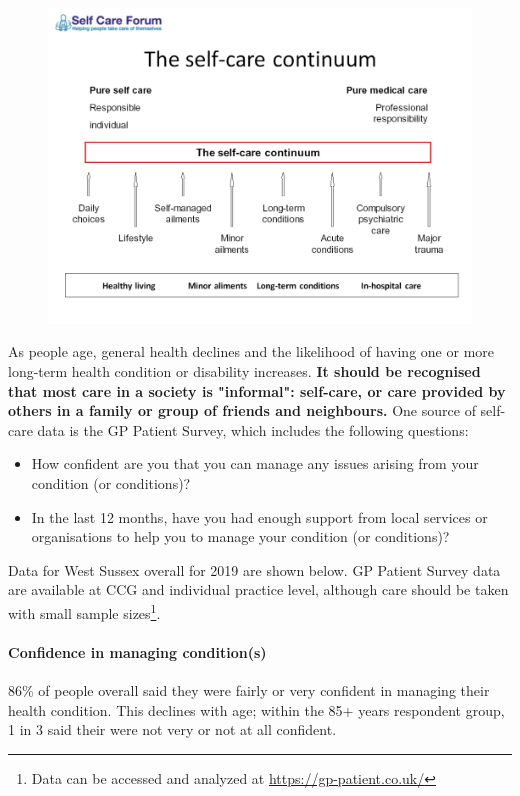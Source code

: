\begin{figure}
    \includegraphics[width=\linewidth]{images/04-self-care-continuum.jpeg}
\end{figure}

As people age, general health declines and the likelihood of having one or more long-term health condition or disability increases. {\bfseries It should be recognised that most care in a society is "informal": self-care, or care provided by others in a family or group of friends and neighbours.} One source of self-care data is the GP Patient Survey, which includes the following questions:

\begin{itemize}[noitemsep]
    \item How confident are you that you can manage any issues arising from your condition (or conditions)?
    \item In the last 12 months, have you had enough support from local services or organisations to help you to manage your condition (or conditions)?
\end{itemize}

Data for West Sussex overall for 2019 are shown below. GP Patient Survey data are available at CCG and individual practice level, although care should be taken with small sample sizes\footnote{Data can be accessed and analyzed at \url{https://gp-patient.co.uk/}}.

\paragraph{Confidence in managing condition(s)} 86\% of people overall said they were fairly or very confident in managing their health condition. This declines with age; within the 85+ years respondent group, 1 in 3 said their were not very or not at all confident.

